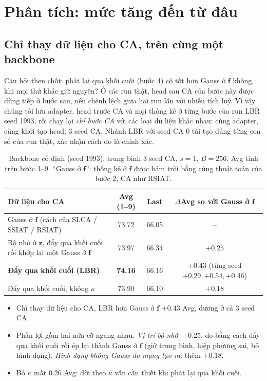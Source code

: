 \documentclass[11pt]{article}
\newcommand{\vf}{\mathbf{f}}
\newcommand{\vz}{\mathbf{z}}
\begin{document}
\section{Phân tích: mức tăng đến từ đâu}\label{sec:ablation}

\subsection{Chỉ thay dữ liệu cho CA, trên cùng một backbone}\label{sec:offline}
Câu hỏi then chốt: phát lại qua khối cuối (bước 4) có tốt hơn Gauss ở $\vf$ không, khi mọi thứ khác giữ nguyên? Ở các
run thật, head sau CA của bước này được dùng tiếp ở bước sau, nên chênh lệch giữa hai run lẫn với nhiễu tích luỹ. Vì
vậy chúng tôi lưu adapter, head trước CA và mọi thống kê ở từng bước của run LBR seed 1993, rồi chạy lại \emph{chỉ bước
CA} với các loại dữ liệu khác nhau: cùng adapter, cùng khởi tạo head, 3 seed CA. Nhánh LBR với seed CA 0 tái tạo đúng
từng con số của run thật, xác nhận cách đo là chính xác.

\begin{table}[H]
\centering\small
\caption{Backbone cố định (seed 1993), trung bình 3 seed CA, $s=1$, $B=256$. Avg tính trên bước 1--9. ``Gauss ở
$\vf$'': thống kê ở $\vf$ được bám trôi bằng cùng thuật toán của bước 2, CA như RSIAT.}
\label{tab:offline}
\begin{tabular}{lccc}
\toprule
Dữ liệu cho CA & Avg (1--9) & Last & $\Delta$Avg so với Gauss ở $\vf$\\
\midrule
Gauss ở $\vf$ (cách của SLCA / SSIAT / RSIAT) & 73.72 & 66.05 & --\\
Bộ nhớ ở $\vz$, đẩy qua khối cuối rồi khớp lại một Gauss ở $\vf$ & 73.97 & 66.34 & $+0.25$\\
\textbf{Đẩy qua khối cuối (LBR)} & \textbf{74.16} & 66.16 & $\mathbf{+0.43}$ (từng seed $+0.29, +0.54, +0.46$)\\
Đẩy qua khối cuối, không $\kappa$ & 73.90 & 66.10 & $+0.18$\\
\bottomrule
\end{tabular}
\end{table}
\begin{itemize}
\item Chỉ thay dữ liệu cho CA, LBR hơn Gauss ở $\vf$ $+0.43$ Avg, dương ở cả 3 seed CA.
\item Phần lợi gồm hai nửa cỡ ngang nhau. \emph{Vị trí bộ nhớ}: $+0.25$, đo bằng cách đẩy qua khối cuối rồi ép lại thành
      Gauss ở $\vf$ (giữ trung bình, hiệp phương sai, bỏ hình dạng). \emph{Hình dạng không Gauss do mạng tạo ra}: thêm
      $+0.18$.
\item Bỏ $\kappa$ mất $0.26$ Avg: dời theo $\kappa$ vẫn cần thiết khi phát lại qua khối cuối.
\end{itemize}
\end{document}
